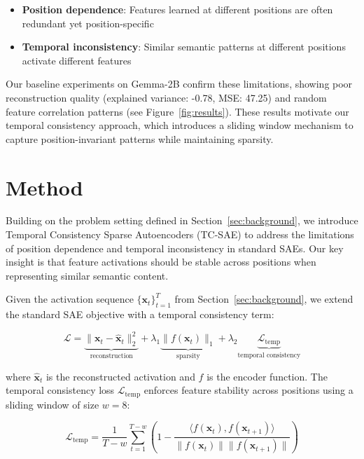 \documentclass{article} %
\begin{document}
\begin{itemize}
    \item \textbf{Position dependence}: Features learned at different positions are often redundant yet position-specific
    \item \textbf{Temporal inconsistency}: Similar semantic patterns at different positions activate different features
\end{itemize}

Our baseline experiments on Gemma-2B confirm these limitations, showing poor reconstruction quality (explained variance: -0.78, MSE: 47.25) and random feature correlation patterns (see Figure~\ref{fig:results}). These results motivate our temporal consistency approach, which introduces a sliding window mechanism to capture position-invariant patterns while maintaining sparsity.


\section{Method}
\label{sec:method}

Building on the problem setting defined in Section~\ref{sec:background}, we introduce Temporal Consistency Sparse Autoencoders (TC-SAE) to address the limitations of position dependence and temporal inconsistency in standard SAEs. Our key insight is that feature activations should be stable across positions when representing similar semantic content.

Given the activation sequence $\{\mathbf{x}_t\}_{t=1}^T$ from Section~\ref{sec:background}, we extend the standard SAE objective with a temporal consistency term:

\begin{equation}
\mathcal{L} = \underbrace{\|\mathbf{x}_t - \hat{\mathbf{x}}_t\|_2^2}_{\text{reconstruction}} + \lambda_1\underbrace{\|f(\mathbf{x}_t)\|_1}_{\text{sparsity}} + \lambda_2\underbrace{\mathcal{L}_{\text{temp}}}_{\text{temporal consistency}}
\end{equation}

where $\hat{\mathbf{x}}_t$ is the reconstructed activation and $f$ is the encoder function. The temporal consistency loss $\mathcal{L}_{\text{temp}}$ enforces feature stability across positions using a sliding window of size $w=8$:

\begin{equation}
\mathcal{L}_{\text{temp}} = \frac{1}{T-w}\sum_{t=1}^{T-w}\left(1 - \frac{\langle f(\mathbf{x}_t), f(\mathbf{x}_{t+1})\rangle}{\|f(\mathbf{x}_t)\|\|f(\mathbf{x}_{t+1})\|}\right)
\end{equation}
\end{document}
